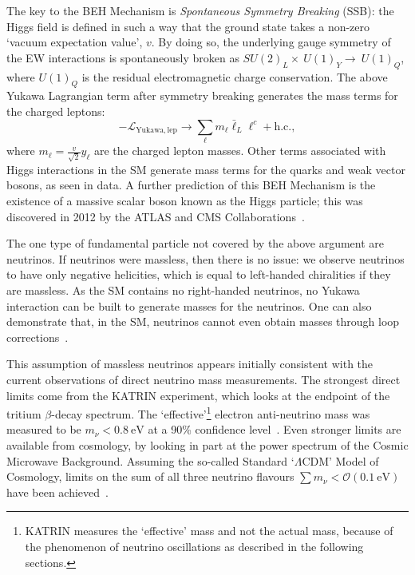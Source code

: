 The key to the BEH Mechanism is \textit{Spontaneous Symmetry Breaking} (SSB): the Higgs field is defined in such a way that the ground state takes a non-zero `vacuum expectation value', $v$. By doing so, the underlying gauge symmetry of the EW interactions is spontaneously broken as $SU(2)_{L}\times~U(1)_{Y}\to~U(1)_{Q}$, where $U(1)_{Q}$ is the residual electromagnetic charge conservation. The above Yukawa Lagrangian term after symmetry breaking generates the mass terms for the charged leptons:
\begin{equation}
    -\mathcal{L}_{\mathrm{Yukawa,lep}} \to \sum_{\ell}m_{\ell}\bar{\ell}_{L}\ell^{c} + \mathrm{h.c.},
\end{equation}
where $m_{\ell} = \frac{v}{\sqrt{2}}y_{\ell}$ are the charged lepton masses. Other terms associated with Higgs interactions in the SM generate mass terms for the quarks and weak vector bosons, as seen in data. A further prediction of this BEH Mechanism is the existence of a massive scalar boson known as the Higgs particle; this was discovered in 2012 by the ATLAS and CMS Collaborations~\cite{aadObservationNewParticle2012,chatrchyanObservationNewBoson2012}. %

The one type of fundamental particle not covered by the above argument are neutrinos. If neutrinos were massless, then there is no issue: we observe neutrinos to have only negative helicities, which is equal to left-handed chiralities if they are massless. As the SM contains no right-handed neutrinos, no Yukawa interaction can be built to generate masses for the neutrinos. One can also demonstrate that, in the SM, neutrinos cannot even obtain masses through loop corrections~\cite{workmanReviewParticlePhysics2022}. %

This assumption of massless neutrinos appears initially consistent with the current observations of direct neutrino mass measurements. The strongest direct limits come from the KATRIN experiment, which looks at the endpoint of the tritium $\beta$-decay spectrum. The `effective'\footnote{
    KATRIN measures the `effective' mass and not the actual mass, because of the phenomenon of neutrino oscillations as described in the following sections.
} electron anti-neutrino mass was measured to be $m_{\nu} < \SI{0.8}{\eV}$ at a 90\% confidence level~\cite{akerDirectNeutrinomassMeasurement2022}. %
Even stronger limits are available from cosmology, by looking in part at the power spectrum of the Cosmic Microwave Background. Assuming the so-called Standard `$\Lambda$CDM' Model of Cosmology, limits on the sum of all three neutrino flavours $\sum m_{\nu}<\mathcal{O}(\SI{0.1}{\eV})$ have been achieved~\cite{divalentinoMostConstrainingCosmological2021}. %

